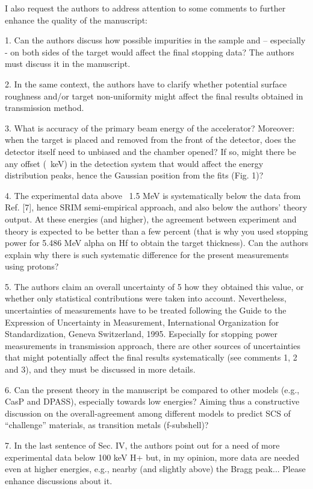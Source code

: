 I also request the authors to address attention to some comments to
further enhance the quality of the manuscript:

1. Can the authors discuss how possible impurities in the sample and –
especially - on both sides of the target would affect the final
stopping data? The authors must discuss it in the manuscript.

2. In the same context, the authors have to clarify whether potential
surface roughness and/or target non-uniformity might affect the final
results obtained in transmission method.

3. What is accuracy of the primary beam energy of the accelerator?
Moreover: when the target is placed and removed from the front of the
detector, does the detector itself need to unbiased and the chamber
opened? If so, might there be any offset (~keV) in the detection
system that would affect the energy distribution peaks, hence the
Gaussian position from the fits (Fig. 1)?

4. The experimental data above ~1.5 MeV is systematically below the
data from Ref. [7], hence SRIM semi-empirical approach, and also below
the authors’ theory output. At these energies (and higher), the
agreement between experiment and theory is expected to be better than
a few percent (that is why you used stopping power for 5.486 MeV alpha
on Hf to obtain the target thickness). Can the authors explain why
there is such systematic difference for the present measurements using
protons?

5. The authors claim an overall uncertainty of 5%
how they obtained this value, or whether only statistical
contributions were taken into account. Nevertheless, uncertainties of
measurements have to be treated following the Guide to the Expression
of Uncertainty in Measurement, International Organization for
Standardization, Geneva Switzerland, 1995. Especially for stopping
power measurements in transmission approach, there are other sources
of uncertainties that might potentially affect the final results
systematically (see comments 1, 2 and 3), and they must be discussed
in more details.

6. Can the present theory in the manuscript be compared to other
models (e.g., CasP and DPASS), especially towards low energies? Aiming
thus a constructive discussion on the overall-agreement among
different models to predict SCS of “challenge” materials, as
transition metals (f-subshell)?

7. In the last sentence of Sec. IV, the authors point out for a need
of more experimental data below 100 keV H+ but, in my opinion, more
data are needed even at higher energies, e.g., nearby (and slightly
above) the Bragg peak... Please enhance discussions about it.

